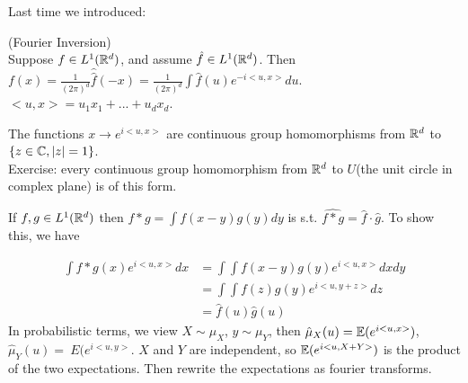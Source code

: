 \documentclass[a4paper]{article}
\begin{document}
Last time we introduced:

\begin{thm} (Fourier Inversion)\\
Suppose $f \in L^1(\mathbb{R}^d)$, and assume $\hat{f} \in L^1(\mathbb{R}^d)$. Then $f(x) = \frac{1}{(2\pi)^d} \hat{\hat{f}}(-x) = \frac{1}{(2\pi)^d} \int \hat{f}(u) e^{-i<u,x>} du$.\\
$<u,x> = u_1x_1+...+u_dx_d$.
\end{thm}

\begin{rem}
The functions $x \to e^{i<u,x>}$ are continuous group homomorphisms from $\mathbb{R}^d$ to $\{z \in \mathbb{C}, |z| = 1\}$.\\
Exercise: every continuous group homomorphism from $\mathbb{R}^d$ to $U$(the unit circle in complex plane) is of this form.
\end{rem}

\begin{rem}
If $f,g \in L^1(\mathbb{R}^d)$ then $f*g = \int f(x-y) g(y) dy$ is s.t. $\hat{f*g} = \hat{f} \cdot \hat{g}$. To show this, we have

\begin{equation*}
\begin{aligned}
\int f*g(x) e^{i<u,x>} dx &= \int\int f(x-y) g(y) e^{i<u,x>} dxdy\\
&= \int\int f(z) g(y) e^{i<u,y+z>} dz\\
&= \hat{f}(u) \hat{g}(u)
\end{aligned}
\end{equation*}
In probabilistic terms, we view $X \sim \mu_X$, $y \sim \mu_Y$, then $\hat{\mu}_X(u) = \mathbb{E}(e^{i<u,x>})$, $\hat{\mu}_Y(u) =\ E(e^{i<u,y>}$. $X$ and $Y$ are independent, so $\mathbb{E}(e^{i<u,X+Y>})$ is the product of the two expectations. Then rewrite the expectations as fourier transforms.
\end{rem}
\end{document}
